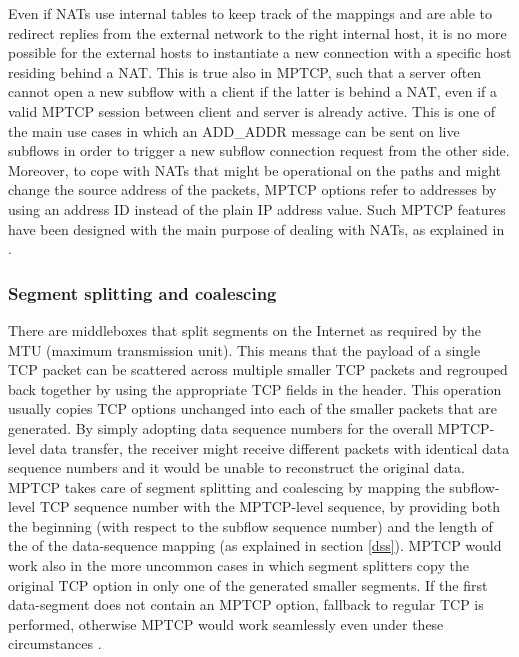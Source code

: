 Even if NATs use internal tables to keep track of the mappings and are able to redirect replies from the external network to the right internal host, it is no more possible for the external hosts to instantiate a new connection with a specific host residing behind a NAT. This is true also in MPTCP, such that a server often cannot open a new subflow with a client if the latter is behind a NAT, even if a valid MPTCP session between client and server is already active. This is one of the main use cases in which an ADD\_ADDR message can be sent on live subflows in order to trigger a new subflow connection request from the other side. Moreover, to cope with NATs that might be operational on the paths and might change the source address of the packets, MPTCP options refer to addresses by using an address ID instead of the plain IP address value. Such MPTCP features have been designed with the main purpose of dealing with NATs, as explained in .

\subsubsection{Segment splitting and coalescing}
There are middleboxes that split segments on the Internet as required by the MTU (maximum transmission unit). This means that the payload of a single TCP packet can be scattered across multiple smaller TCP packets and regrouped back together by using the appropriate TCP fields in the header. This operation usually copies TCP options unchanged into each of the smaller packets that are generated. By simply adopting data sequence numbers for the overall MPTCP-level data transfer, the receiver might receive different packets with identical data sequence numbers and it would be unable to reconstruct the original data. MPTCP takes care of segment splitting and coalescing by mapping the subflow-level TCP sequence number with the MPTCP-level sequence, by providing both the beginning (with respect to the subflow sequence number) and the length of the of the data-sequence mapping (as explained in section \ref{dss}).
MPTCP would work also in the more uncommon cases in which segment splitters copy the original TCP option in only one of the generated smaller segments. If the first data-segment does not contain an MPTCP option, fallback to regular TCP is performed, otherwise MPTCP would work seamlessly even under these circumstances \cite{HDPDB13}.

